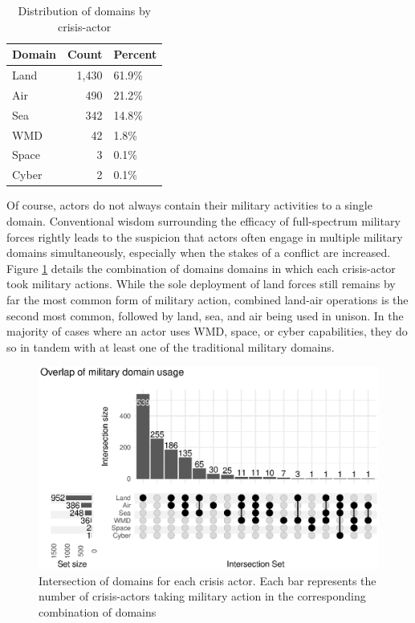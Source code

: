\documentclass[
]{article}
\begin{document}
\begin{table}[H]

\caption{\label{tab:domain-count}Distribution of domains by crisis-actor}
\centering
\begin{tabular}[t]{l|r|l}
\hline
\textbf{Domain} & \textbf{Count} & \textbf{Percent}\\
\hline
Land & 1,430 & 61.9\%\\
\hline
Air & 490 & 21.2\%\\
\hline
Sea & 342 & 14.8\%\\
\hline
WMD & 42 & 1.8\%\\
\hline
Space & 3 & 0.1\%\\
\hline
Cyber & 2 & 0.1\%\\
\hline
\end{tabular}
\end{table}

Of course, actors do not always contain their military activities to a single domain. Conventional wisdom surrounding the efficacy of full-spectrum military forces rightly leads to the suspicion that actors often engage in multiple military domains simultaneously, especially when the stakes of a conflict are increased. Figure \ref{fig:fig-1} details the combination of domains domains in which each crisis-actor took military actions. While the sole deployment of land forces still remains by far the most common form of military action, combined land-air operations is the second most common, followed by land, sea, and air being used in unison. In the majority of cases where an actor uses WMD, space, or cyber capabilities, they do so in tandem with at least one of the traditional military domains.

\begin{figure}[h!]

{\centering \includegraphics{2022-05-03_ICB-Domains_files/figure-latex/fig-1-1} 

}

\caption{Intersection of domains for each crisis actor. Each bar represents the number of crisis-actors taking military action in the corresponding combination of domains}\label{fig:fig-1}
\end{figure}
\end{document}
